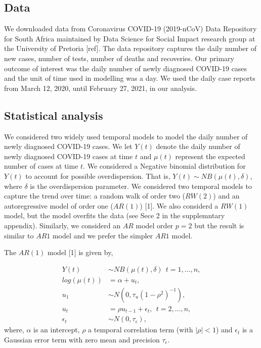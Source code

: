 \documentclass[10pt,letterpaper]{article}
\begin{document}
\hypertarget{data}{%
\subsection{Data}\label{data}}

We downloaded data from Coronavirus COVID-19 (2019-nCoV) Data Repository
for South Africa maintained by Data Science for Social Impact research
group at the University of Pretoria {[}ref{]}. The data repository
captures the daily number of new cases, number of tests, number of
deaths and recoveries. Our primary outcome of interest was the daily
number of newly diagnosed COVID-19 cases and the unit of time used in
modelling was a day. We used the daily case reports from March 12, 2020,
until February 27, 2021, in our analysis.

\hypertarget{statistical-analysis}{%
\subsection{Statistical analysis}\label{statistical-analysis}}

We considered two widely used temporal models to model the daily number
of newly diagnosed COVID-19 cases. We let \(Y(t)\) denote the daily
number of newly diagnosed COVID-19 cases at time \(t\) and \(\mu(t)\)
represent the expected number of cases at time \(t\). We considered a
Negative binomial distribution for \(Y(t)\) to account for possible
overdispersion. That is, \(Y(t) \sim NB(\mu(t), \delta)\), where
\(\delta\) is the overdispersion parameter. We considered two temporal
models to capture the trend over time: a random walk of order two
(\(RW(2)\)) and an autoregressive model of order one (\(AR(1)\))
{[}1{]}. We also considerd a \(RW(1)\) model, but the model overfits the
data (see Sece 2 in the supplemntary appendix). Similarly, we considerd
an \(AR\) model order \(p=2\) but the result is similar to \(AR1\) model
and we prefer the simpler \(AR1\) model.

The \(AR(1)\) model {[}1{]} is given by,

\[
\begin{aligned}
 Y(t) &\sim NB(\mu(t), \delta) \ \ t=1, \dots, n,\\
 log(\mu(t)) &= \alpha+u_t, \\
 u_1 &\sim N(0, \tau_u(1-\rho^2)^{-1}),  \\
  u_t &=\rho u_{t-1} +\epsilon_t, \ \ t=2, \dots, n,  \\
  \epsilon_t & \sim N(0, \tau_{\epsilon}),
\end{aligned}
\] where, \(\alpha\) is an intercept, \(\rho\) a temporal correlation
term (with \(|\rho|<1\)) and \(\epsilon_t\) is a Gaussian error term
with zero mean and precision \(\tau_{\epsilon}\).
\end{document}
